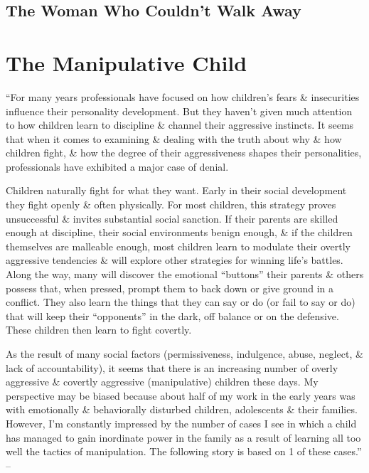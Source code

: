 \documentclass{article}
\numberwithin{equation}{section}
\begin{document}
\subsection{The Woman Who Couldn't Walk Away}


\section{The Manipulative Child}
``For many years professionals have focused on how children's fears \& insecurities influence their personality development. But they haven't given much attention to how children learn to discipline \& channel their aggressive instincts. It seems that when it comes to examining \& dealing with the truth about why \& how children fight, \& how the degree of their aggressiveness shapes their personalities, professionals have exhibited a major case of denial.

Children naturally fight for what they want. Early in their social development they fight openly \& often physically. For most children, this strategy proves unsuccessful \& invites substantial social sanction. If their parents are skilled enough at discipline, their social environments benign enough, \& if the children themselves are malleable enough, most children learn to modulate their overtly aggressive tendencies \& will explore other strategies for winning life's battles. Along the way, many will discover the emotional ``buttons'' their parents \& others possess that, when pressed, prompt them to back down or give ground in a conflict. They also learn the things that they can say or do (or fail to say or do) that will keep their ``opponents'' in the dark, off balance or on the defensive. These children then learn to fight covertly.

As the result of many social factors (permissiveness, indulgence, abuse, neglect, \& lack of accountability), it seems that there is an increasing number of overly aggressive \& covertly aggressive (manipulative) children these days. My perspective may be biased because about half of my work in the early years was with emotionally \& behaviorally disturbed children, adolescents \& their families. However, I'm constantly impressed by the number of cases I see in which a child has managed to gain inordinate power in the family as a result of learning all too well the tactics of manipulation. The following story is based on 1 of these cases.'' -- \cite[pp. 83--84]{Simon2010}
\end{document}
